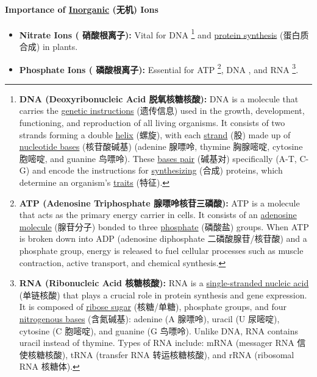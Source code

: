 \paragraph{Importance of \underline{Inorganic} (无机) Ions}
\begin{itemize}
    \item \textbf{Nitrate Ions ( 硝酸根离子):} Vital for DNA \footnote{\textbf{DNA (Deoxyribonucleic Acid 脱氧核糖核酸):} DNA
    is a molecule that carries the \underline{genetic instructions} (遗传信息) used in the growth, development, functioning, and
    reproduction of all living organisms. It consists of two strands forming a double \underline{helix} (螺旋), with each
    \underline{strand} (股) made up of \underline{nucleotide bases} (核苷酸碱基) (adenine 腺嘌呤, thymine 胸腺嘧啶, cytosine 胞嘧啶,
    and guanine 鸟嘌呤). These \underline{bases pair} (碱基对) specifically (A-T, C-G) and encode the instructions for
    \underline{synthesizing} (合成) proteins, which determine an organism's \underline{traits} (特征).} and \underline{protein
    synthesis} (蛋白质合成) in plants.
    \item \textbf{Phosphate Ions ( 磷酸根离子):} Essential for ATP \footnote{\textbf{ATP (Adenosine Triphosphate
    腺嘌呤核苷三磷酸):} ATP is a molecule that acts as the primary energy carrier in cells. It consists of an \underline{adenosine
    molecule} (腺苷分子) bonded to three \underline{phosphate} (磷酸盐) groups. When ATP is broken down into ADP (adenosine
    diphosphate 二磷酸腺苷/核苷酸) and a phosphate group, energy is released to fuel cellular processes such as muscle contraction,
    active transport, and chemical synthesis.}, DNA \footnotemark[3], and RNA \footnote{\textbf{RNA (Ribonucleic Acid 核糖核酸):}
    RNA is a \underline{single-stranded nucleic acid} (单链核酸) that plays a crucial role in protein synthesis and gene
    expression. It is composed of \underline{ribose sugar} (核糖/单糖), phosphate groups, and four \underline{nitrogenous bases}
    (含氮碱基): adenine (A 腺嘌呤), uracil (U 尿嘧啶), cytosine (C 胞嘧啶), and guanine (G 鸟嘌呤). Unlike DNA, RNA contains uracil
    instead of thymine. Types of RNA include: mRNA \footnotemark[6] (messager RNA 信使核糖核酸), tRNA \footnotemark[7] (transfer
    RNA 转运核糖核酸), and rRNA \footnotemark[8] (ribosomal RNA 核糖体).}.
\end{itemize}
